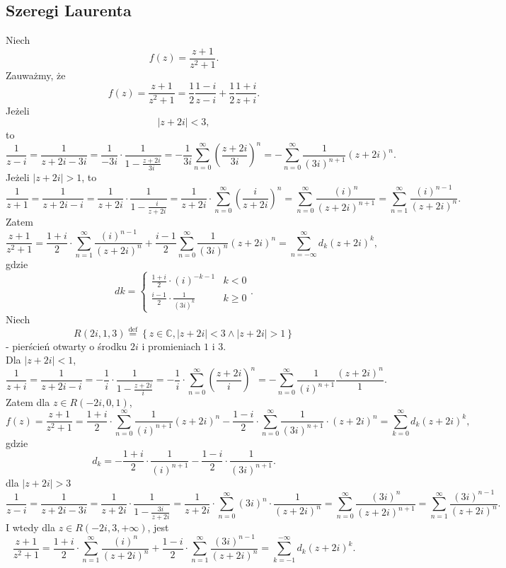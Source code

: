\documentclass[../main.tex]{subfiles}
\begin{document}
\subsection{Szeregi Laurenta}
\begin{przyklad}
    Niech
    \[
        f(z) = \frac{z+1}{z^2 + 1}
    .\]
Zauważmy, że
\[
    f(z) = \frac{z+1}{z^2 + 1} = \frac{1}{2}\frac{1-i}{z - i} + \frac{1}{2}\frac{1+i}{z+i}
.\]
Jeżeli
\[
\left| z+2i \right| < 3
,\]
to \[
    \frac{1}{z-i} = \frac{1}{z + 2i - 3i} = \frac{1}{-3i}\cdot \frac{1}{1-\frac{z+2i}{3i}} = -\frac{1}{3i}\sum_{n=0}^{\infty} \left( \frac{z+2i}{3i} \right) ^{n} = - \sum_{n=0}^{\infty} \frac{1}{(3i)^{n+1}}\left( z+2i \right)^n
.\]
Jeżeli $|z+2i| > 1$, to
\[
    \frac{1}{z+1} = \frac{1}{z + 2i - i} = \frac{1}{z+2i}\cdot \frac{1}{1- \frac{i}{z+2i}} = \frac{1}{z+2i} \cdot \sum_{n=0}^{\infty} \left( \frac{i}{z+2i} \right) ^n = \sum_{n=0}^{\infty} \frac{(i)^n}{(z+2i)^{n+1}} = \sum_{n=1}^{\infty} \frac{(i)^{n-1}}{(z+2i)^n}
.\]
Zatem
\[
    \frac{z+1}{z^2 + 1} = \frac{1+i}{2} \cdot \sum_{n=1}^{\infty} \frac{(i)^{n-1}}{(z+2i)^n} + \frac{i-1}{2} \sum_{n=0}^{\infty} \frac{1}{(3i)^n}(z+2i)^n = \sum_{n=-\infty}^{\infty} d_k (z+2i)^k
,\]
gdzie
\[
dk = \begin{cases}
    \frac{1+i}{2}\cdot (i)^{-k-1} & k <0 \\
    \frac{i - 1}{2}\cdot \frac{1}{(3i)^{k}} & k \ge 0
\end{cases}
.\]
Niech
    \[
        R(2i, 1, 3) \overset{\text{def}}{=} \left\{ z\in\mathbb{C}, |z+2i| < 3 \land |z + 2i| > 1 \right\}
    \]
    - pierścień otwarty o środku $2i$ i promieniach $1$ i $3$.\\
    Dla $|z+2i| < 1$,
     \[
         \frac{1}{z+i} = \frac{1}{z+2i-i} = -\frac{1}{i} \cdot \frac{1}{1 - \frac{z+2i}{i}} = -\frac{1}{i} \cdot \sum_{n=0}^{\infty} \left(\frac{z+2i}{i}\right)^n = -\sum_{n=0}^{\infty} \frac{1}{(i)^{n+1}}\frac{(z+2i)^n}{1}
    .\]
Zatem dla $z\in R(-2i, 0, 1)$,
\[
    f(z) = \frac{z+1}{z^2 + 1} = \frac{1+i}{2}\cdot \sum_{n=0}^{\infty} \frac{1}{(i)^{n+1}}(z+2i)^n - \frac{1-i}{2}\cdot \sum_{n=0}^{\infty} \frac{1}{(3i)^{n+1}}\cdot (z+2i)^n = \sum_{k = 0}^{\infty}d_k \left( z+2i \right) ^k
,\]
gdzie
\[
    d_k = -\frac{1+i}{2}\cdot \frac{1}{(i)^{n+1}} - \frac{1-i}{2}\cdot \frac{1}{(3i)^{n+1}}
.\]
dla $|z+2i| > 3$
\[
    \frac{1}{z-i} = \frac{1}{z+2i-3i} = \frac{1}{z+2i}\cdot \frac{1}{1 - \frac{3i}{z+2i}} = \frac{1}{z+2i}\cdot \sum_{n=0}^{\infty} (3i)^n\cdot \frac{1}{(z+2i)^n} = \sum_{n=0}^{\infty} \frac{(3i)^n}{(z+2i)^{n+1}} = \sum_{n=1}^{\infty} \frac{(3i)^{n-1}}{(z+2i)^n}
.\]
I wtedy dla $z\in R(-2i,3,+\infty)$, jest
\[
    \frac{z+1}{z^2+1} = \frac{1+i}{2} \cdot \sum_{n=1}^{\infty} \frac{(i)^n}{(z+2i)^n} + \frac{1-i}{2}\cdot \sum_{n=1}^{\infty} \frac{(3i)^{n-1}}{(z+2i)^n} = \sum_{k=-1}^{-\infty} d_k (z+2i)^k
.\]
\end{przyklad}
\end{document}
